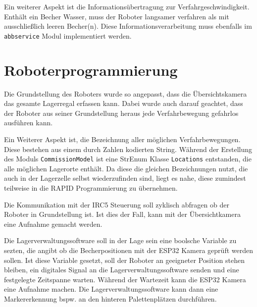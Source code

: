 Ein weiterer Aspekt ist die Informationsübertragung zur Verfahrgeschwindigkeit. Enthält ein Becher Wasser, muss der Roboter langsamer verfahren als mit ausschließlich leeren Becher(n).
Diese Informationsverarbeitung muss ebenfalls im \verb|abbservice| Modul implementiert werden.

\section{Roboterprogrammierung} \label{sec:Roboterprogrammierung}

Die Grundstellung des Roboters wurde so angepasst, dass die Übersichtskamera das gesamte Lagerregal erfassen kann. 
Dabei wurde auch darauf geachtet, dass der Roboter aus seiner Grundstellung heraus jede Verfahrbewegung gefahrlos ausführen kann.

Ein Weiterer Aspekt ist, die Bezeichnung aller möglichen Verfahrbewegungen. Diese bestehen aus einem durch Zahlen kodierten String. 
Während der Erstellung des Moduls \verb|CommissionModel| ist eine StrEnum Klasse \verb|Locations| entstanden, die alle möglichen Lagerorte enthält.
Da diese die gleichen Bezeichnungen nutzt, die auch in der Lagerzelle selbst wiederzufinden sind, liegt es nahe, diese zumindest teilweise in die RAPID Programmierung zu übernehmen.

Die Kommunikation mit der IRC5 Steuerung soll zyklisch abfragen ob der Roboter in Grundstellung ist. 
Ist dies der Fall, kann mit der Übersichtkamera eine Aufnahme gemacht werden. 

Die Lagerverwaltungssoftware soll in der Lage sein eine boolsche Variable zu sezten, die angibt ob die Becherpositionen mit der ESP32 Kamera geprüft werden sollen. 
Ist diese Variable gesetzt, soll der Roboter an geeigneter Position stehen bleiben, ein digitales Signal an die Lagerverwaltungssoftware senden und eine festgelegte Zeitspanne warten. 
Während der Wartezeit kann die ESP32 Kamera eine Aufnahme machen. Die Lagerverwaltungssoftware kann dann eine Markererkennung bspw. an den hinteren Palettenplätzen durchführen.
